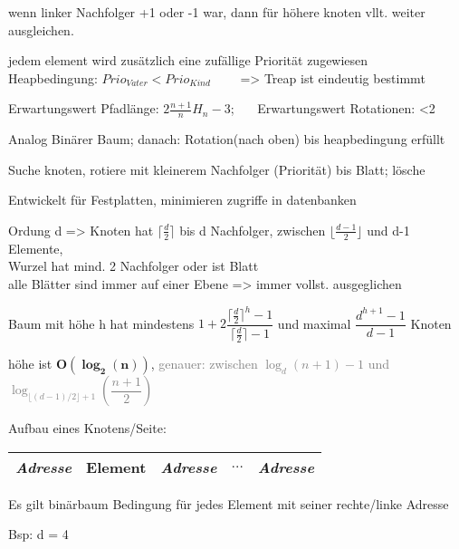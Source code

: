 wenn linker Nachfolger +1 oder -1 war, dann für höhere knoten vllt. weiter ausgleichen.





jedem element wird zusätzlich eine zufällige Priorität zugewiesen\\
Heapbedingung: $Prio_{Vater} < Prio_{Kind}$~~~~
=> Treap ist eindeutig bestimmt

Erwartungswert Pfadlänge: $2\frac{n+1}{n}H_n-3$; ~~~Erwartungswert Rotationen: <2 

Analog Binärer Baum; danach: Rotation(nach oben) bis heapbedingung erfüllt

Suche knoten, rotiere mit kleinerem Nachfolger (Priorität) bis Blatt; lösche


\renewcommand{\min}{\lceil\frac{d}{2}\rceil}
\newcommand{\mincontent}{\lfloor\frac{d-1}{2}\rfloor}
Entwickelt für Festplatten, minimieren zugriffe in datenbanken

Ordung d => Knoten hat $\min$ bis d Nachfolger, zwischen $\mincontent$ und d-1 Elemente,\\
Wurzel hat mind. 2 Nachfolger oder ist Blatt \\
alle Blätter sind immer auf einer Ebene => immer vollst. ausgeglichen 

Baum mit höhe h hat mindestens $1+2\dfrac{\min^h - 1}{\min -1}$ und maximal $ \dfrac{d^{h+1}-1}{d-1}$ Knoten

höhe ist $\mathbf{O(\log_2(n))}$, \textcolor{gray}{genauer: zwischen $\log_d(n+1)-1$ und $\log_{\lfloor(d-1)/2\rfloor+1}\left(\dfrac{n+1}{2}\right)$}

Aufbau eines Knotens/Seite:
\begin{tabular}{|c|c|c|c|c|}
\hline
\textit{Adresse} & Element & \textit{Adresse} & $\dots$ & \textit{Adresse}\\
\hline
\end{tabular}

Es gilt binärbaum Bedingung für jedes Element mit seiner rechte/linke Adresse

Bsp: d = 4


